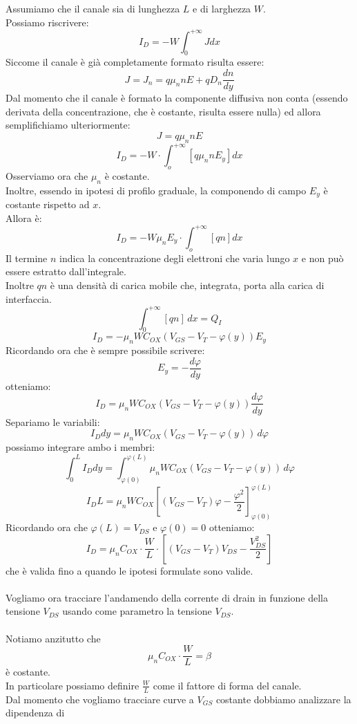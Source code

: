 \documentclass[../main.tex]{subfiles}
\begin{document}
	Assumiamo che il canale sia di lunghezza $L$ e di larghezza $W$.\\
	Possiamo riscrivere:
	$$I_D = -W \int_0^{+\infty} J dx$$
	Siccome il canale è già completamente formato risulta essere:
	$$J = J_n = q\mu_n n E + qD_n \frac{dn}{dy}$$
	Dal momento che il canale è formato la componente diffusiva non conta (essendo derivata della concentrazione, che è costante, risulta essere nulla) ed allora semplifichiamo ulteriormente:
	$$J = q\mu_n n E$$
	$$I_D = -W \cdot \int_o^{+\infty} [q\mu_n n E_y] dx$$
	Osserviamo ora che $\mu_n$ è costante.\\
	Inoltre, essendo in ipotesi di profilo graduale, la componendo di campo $E_y$ è costante rispetto ad $x$.\\
	Allora è:
	$$I_D = -W \mu_n E_y \cdot \int_o^{+\infty} [qn] dx$$
	Il termine $n$ indica la concentrazione degli elettroni che varia lungo $x$ e non può essere estratto dall'integrale.\\
	Inoltre $qn$ è una densità di carica mobile che, integrata, porta alla carica di interfaccia.
	$$\int_0^{+\infty} [qn] \, dx = Q_I$$
	$$I_D = -\mu_n W C_{OX} (V_{GS} - V_T - \varphi(y)) E_y$$
	Ricordando ora che è sempre possibile scrivere:
	$$E_y = -\frac{d\varphi}{dy}$$
	otteniamo:
	$$I_D = \mu_n W C_{OX} (V_{GS} - V_T - \varphi(y)) \frac{d\varphi}{dy}$$
	Separiamo le variabili:
	$$I_D dy = \mu_n W C_{OX} (V_{GS} - V_T - \varphi(y)) \, d\varphi$$
	possiamo integrare ambo i membri:
	$$\int_0^L I_D dy = \int_{\varphi(0)}^{\varphi(L)} \mu_n W C_{OX} (V_{GS} - V_T - \varphi(y)) \, d\varphi$$
	$$I_D L = \mu_n W C_{OX} \left[ \left( V_{GS} - V_T\right) \varphi - \frac{\varphi^2}{2} \right]^{\varphi(L)}_{\varphi(0)}$$
	Ricordando ora che $\varphi(L) = V_{DS}$ e $\varphi(0) = 0$ otteniamo:
	$$I_D = \mu_n C_{OX} \cdot \frac{W}{L} \cdot \left[ (V_{GS} - V_T) V_{DS} - \frac{V_{DS}^2}{2} \right]$$
	che è valida fino a quando le ipotesi formulate sono valide.\\\\
	Vogliamo ora tracciare l'andamendo della corrente di drain in funzione della tensione $V_{DS}$ usando come parametro la tensione $V_{DS}$.\\\\
	Notiamo anzitutto che
	$$\mu_n C_{OX} \cdot \frac{W}{L} = \beta$$
	è costante.\\
	In particolare possiamo definire $\frac{W}{L}$ come il fattore di forma del canale.\\
	Dal momento che vogliamo tracciare curve a $V_{GS}$ costante dobbiamo analizzare la dipendenza di
\end{document}
